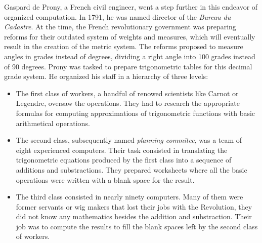         Gaspard de Prony, a French civil engineer, went a step further in this endeavor of organized
        computation\cite[Chapter~2]{human_computers}. In 1791, he was named director of the \emph{Bureau du Cadastre}.
        At the time, the French revolutionary government was preparing reforms for their outdated system of weights and
        measures, which will eventually result in the creation of the metric system. The reforms proposed to measure
        angles in grades instead of degrees, dividing a right angle into 100 grades instead of 90 degrees. Prony was
        tasked to prepare trigonometric tables for this decimal grade system. He organized his staff in a hierarchy of
        three levels:
        \begin{itemize}
            \item The first class of workers, a handful of renowed scientists like Carnot or Legendre, oversaw the
                operations. They had to research the appropriate formulas for computing approximations of trigonometric
                functions with basic arithmetical operations.
            \item The second class, subsequently named \emph{planning commitee}, was a team of eight experienced
                computers. Their task consisted in translating the trigonometric equations produced by the first class
                into a sequence of additions and substractions. They prepared worksheets where all the basic operations
                were written with a blank space for the result.
            \item The third class consisted in nearly ninety computers. Many of them were former servants or wig makers
                that lost their jobs with the Revolution, they did not know any mathematics besides the addition and
                substraction. Their job was to compute the results to fill the blank spaces left by the second class of
                workers.
        \end{itemize}

